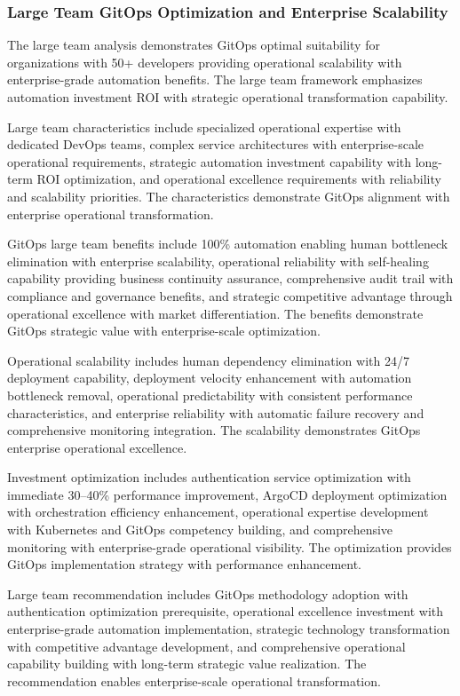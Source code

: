 \subsubsection{Large Team GitOps Optimization and Enterprise Scalability}

The large team analysis demonstrates GitOps optimal suitability for organizations with 50+ developers providing operational scalability with enterprise-grade automation benefits. The large team framework emphasizes automation investment ROI with strategic operational transformation capability.

Large team characteristics include specialized operational expertise with dedicated DevOps teams, complex service architectures with enterprise-scale operational requirements, strategic automation investment capability with long-term ROI optimization, and operational excellence requirements with reliability and scalability priorities. The characteristics demonstrate GitOps alignment with enterprise operational transformation.

GitOps large team benefits include 100\% automation enabling human bottleneck elimination with enterprise scalability, operational reliability with self-healing capability providing business continuity assurance, comprehensive audit trail with compliance and governance benefits, and strategic competitive advantage through operational excellence with market differentiation. The benefits demonstrate GitOps strategic value with enterprise-scale optimization.

Operational scalability includes human dependency elimination with 24/7 deployment capability, deployment velocity enhancement with automation bottleneck removal, operational predictability with consistent performance characteristics, and enterprise reliability with automatic failure recovery and comprehensive monitoring integration. The scalability demonstrates GitOps enterprise operational excellence.

Investment optimization includes authentication service optimization with immediate 30--40\% performance improvement, ArgoCD deployment optimization with orchestration efficiency enhancement, operational expertise development with Kubernetes and GitOps competency building, and comprehensive monitoring with enterprise-grade operational visibility. The optimization provides GitOps implementation strategy with performance enhancement.

Large team recommendation includes GitOps methodology adoption with authentication optimization prerequisite, operational excellence investment with enterprise-grade automation implementation, strategic technology transformation with competitive advantage development, and comprehensive operational capability building with long-term strategic value realization. The recommendation enables enterprise-scale operational transformation.

